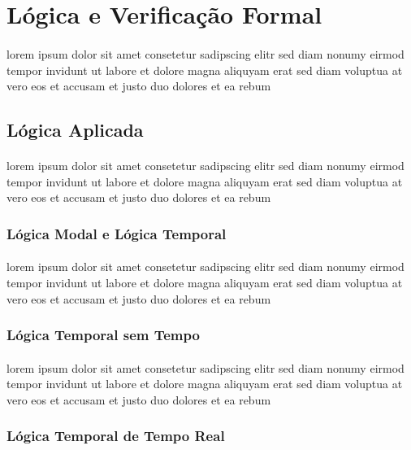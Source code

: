 \section{Lógica e Verificação Formal}
\paragraph{}
lorem ipsum dolor sit amet consetetur sadipscing elitr sed diam nonumy
eirmod tempor invidunt ut labore et dolore magna aliquyam erat sed diam
voluptua at vero eos et accusam et justo duo dolores et ea rebum

\subsection{Lógica Aplicada}
\paragraph{}
lorem ipsum dolor sit amet consetetur sadipscing elitr sed diam nonumy
eirmod tempor invidunt ut labore et dolore magna aliquyam erat sed diam
voluptua at vero eos et accusam et justo duo dolores et ea rebum

\subsubsection{Lógica Modal e Lógica Temporal}
\paragraph{}
lorem ipsum dolor sit amet consetetur sadipscing elitr sed diam nonumy
eirmod tempor invidunt ut labore et dolore magna aliquyam erat sed diam
voluptua at vero eos et accusam et justo duo dolores et ea rebum

\subsubsection{Lógica Temporal sem Tempo}
\paragraph{}
lorem ipsum dolor sit amet consetetur sadipscing elitr sed diam nonumy
eirmod tempor invidunt ut labore et dolore magna aliquyam erat sed diam
voluptua at vero eos et accusam et justo duo dolores et ea rebum

\subsubsection{Lógica Temporal de Tempo Real}

